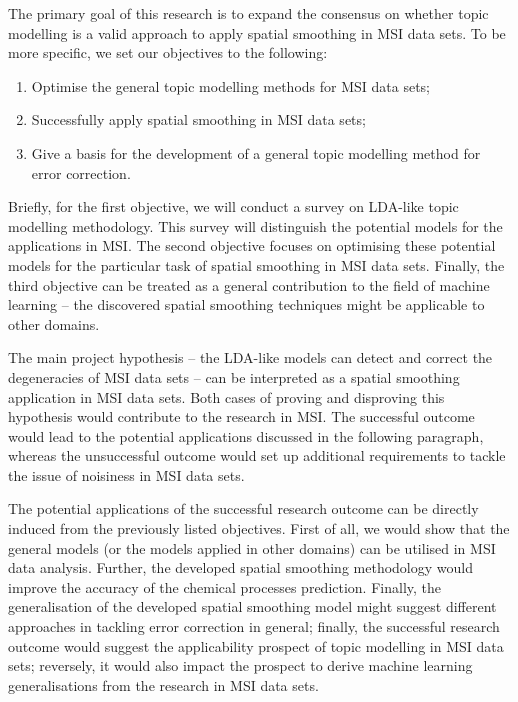 \documentclass{mprop}
\begin{document}
\par The primary goal of this research is to expand the consensus on whether topic modelling is a valid approach to apply spatial smoothing in MSI data sets. To be more specific, we set our objectives to the following:
\begin{enumerate}
    \item Optimise the general topic modelling methods for MSI data sets;
    \item Successfully apply spatial smoothing in MSI data sets;
    \item Give a basis for the development of a general topic modelling method for error correction.
\end{enumerate}
Briefly, for the first objective, we will conduct a survey on LDA-like topic modelling methodology. This survey will distinguish the potential models for the applications in MSI. The second objective focuses on optimising these potential models for the particular task of spatial smoothing in MSI data sets. Finally, the third objective can be treated as a general contribution to the field of machine learning -- the discovered spatial smoothing techniques might be applicable to other domains. 

\par The main project hypothesis -- the LDA-like models can detect and correct the degeneracies of MSI data sets -- can be interpreted as a spatial smoothing application in MSI data sets. Both cases of proving and disproving this hypothesis would contribute to the research in MSI. The successful outcome would lead to the potential applications discussed in the following paragraph, whereas the unsuccessful outcome would set up additional requirements to tackle the issue of noisiness in MSI data sets.

\par The potential applications of the successful research outcome can be directly induced from the previously listed objectives. First of all, we would show that the general models (or the models applied in other domains) can be utilised in MSI data analysis. Further, the developed spatial smoothing methodology would improve the accuracy of the chemical processes prediction. Finally, the generalisation of the developed spatial smoothing model might suggest different approaches in tackling error correction in general; finally, the successful research outcome would suggest the applicability prospect of topic modelling in MSI data sets; reversely, it would also impact the prospect to derive machine learning generalisations from the research in MSI data sets.  
\end{document}
